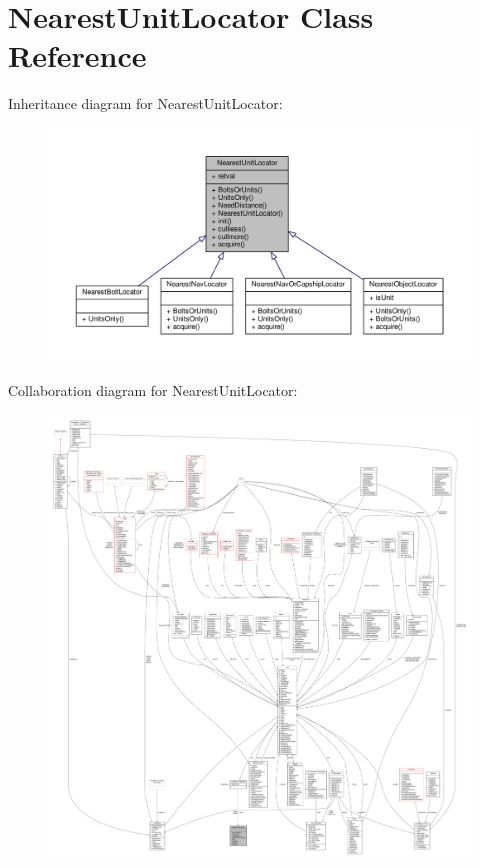 \hypertarget{classNearestUnitLocator}{}\section{Nearest\+Unit\+Locator Class Reference}
\label{classNearestUnitLocator}


Inheritance diagram for Nearest\+Unit\+Locator\+:
\nopagebreak
\begin{figure}[H]
\begin{center}
\leavevmode
\includegraphics[width=350pt]{d6/d97/classNearestUnitLocator__inherit__graph}
\end{center}
\end{figure}


Collaboration diagram for Nearest\+Unit\+Locator\+:
\nopagebreak
\begin{figure}[H]
\begin{center}
\leavevmode
\includegraphics[width=350pt]{da/d3f/classNearestUnitLocator__coll__graph}
\end{center}
\end{figure}

